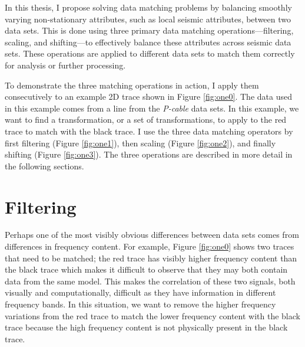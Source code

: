 In this thesis, I propose solving data matching problems by balancing smoothly varying non-stationary attributes, such as local seismic attributes, between two data sets.
This is done using three primary data matching operations---filtering, scaling, and shifting---to effectively balance these attributes across seismic data sets.
These operations are applied to different data sets to match them correctly for analysis or further processing.

To demonstrate the three matching operations in action, I apply them consecutively to an example 2D trace shown in Figure \ref{fig:one0}.
The data used in this example comes from a line from the {\em P-cable} data sets.
In this example, we want to find a transformation, or a set of transformations, to apply to the red trace to match with the black trace.
I use the three data matching operators by first filtering (Figure \ref{fig:one1}), then scaling (Figure \ref{fig:one2}), and finally shifting (Figure \ref{fig:one3}).
The three operations are described in more detail in the following sections.






\section{Filtering}
Perhaps one of the most visibly obvious differences between data sets comes from differences in frequency content.
For example, Figure \ref{fig:one0} shows two traces that need to be matched; the red trace has visibly higher frequency content than the black trace which makes it difficult to observe that they may both contain data from the same model.
This makes the correlation of these two signals, both visually and computationally, difficult as they have information in different frequency bands.
In this situation, we want to remove the higher frequency variations from the red trace to match the lower frequency content with the black trace because the high frequency content is not physically present in the black trace.

